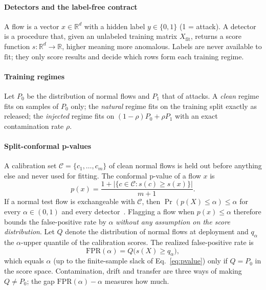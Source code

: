 \documentclass[journal]{IEEEtran}
\newcommand{\fpr}{\mathrm{FPR}}
\begin{document}
\paragraph*{Detectors and the label-free contract}
A flow is a vector $x\in\mathbb{R}^d$ with a hidden label $y\in\{0,1\}$ (1 = attack). A detector is a procedure that, given an unlabeled training matrix $X_{\mathrm{fit}}$, returns a score function $s:\mathbb{R}^d\to\mathbb{R}$, higher meaning more anomalous. Labels are never available to $\mathrm{fit}$; they only score results and decide which rows form each training regime.

\paragraph*{Training regimes}
Let $P_0$ be the distribution of normal flows and $P_1$ that of attacks. A \emph{clean} regime fits on samples of $P_0$ only; the \emph{natural} regime fits on the training split exactly as released; the \emph{injected} regime fits on $(1-\rho)P_0+\rho P_1$ with an exact contamination rate $\rho$.

\paragraph*{Split-conformal p-values}
A calibration set $\mathcal{C}=\{c_1,\dots,c_m\}$ of clean normal flows is held out before anything else and never used for fitting. The conformal p-value of a flow $x$ is
\begin{equation}
p(x)=\frac{1+\left|\{c\in\mathcal{C}: s(c)\ge s(x)\}\right|}{m+1}.
\label{eq:pvalue}
\end{equation}
If a normal test flow is exchangeable with $\mathcal{C}$, then $\Pr\!\left(p(X)\le\alpha\right)\le\alpha$ for every $\alpha\in(0,1)$ and every detector~\cite{vovk2005}. Flagging a flow when $p(x)\le\alpha$ therefore bounds the false-positive rate by $\alpha$ \emph{without any assumption on the score distribution}. Let $Q$ denote the distribution of normal flows at deployment and $q_\alpha$ the $\alpha$-upper quantile of the calibration scores. The realized false-positive rate is
\begin{equation}
\fpr(\alpha)=Q\big(s(X)\ge q_\alpha\big),
\label{eq:realized}
\end{equation}
which equals $\alpha$ (up to the finite-sample slack of Eq.~\ref{eq:pvalue}) only if $Q=P_0$ in the score space. Contamination, drift and transfer are three ways of making $Q\neq P_0$; the gap $\fpr(\alpha)-\alpha$ measures how much.
\end{document}
